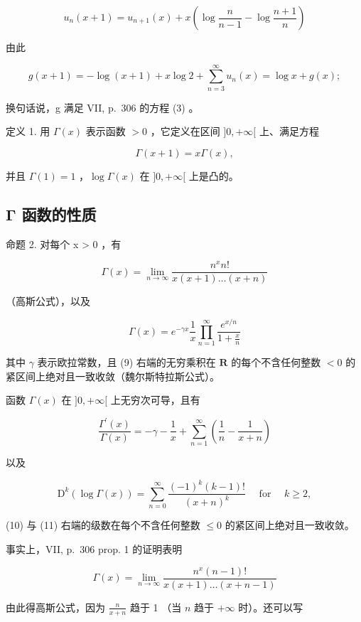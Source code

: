 \[
u _ {n} (x + 1) = u _ {n + 1} (x) + x \left(\log \frac {n}{n - 1} - \log \frac {n + 1}{n}\right)
\]

由此

\[
g (x + 1) = - \log (x + 1) + x \log 2 + \sum_ {n = 3} ^ {\infty} u _ {n} (x) = \log x + g (x);
\]

换句话说，g 满足 VII, p.~306 的方程 (3) 。

定义 1. 用 \(\Gamma(x)\) 表示函数 \(>0\) ，它定义在区间 \(]0, +\infty[\) 上、满足方程

\[
\Gamma (x + 1) = x \Gamma (x),\tag{7}
\]

并且 \(\Gamma(1) = 1\) ，\(\log \Gamma(x)\) 在 \(]0, +\infty[\) 上是凸的。

\subsection{Γ 函数的性质}

命题 2. 对每个 x \textgreater{} 0 ，有

\[
\Gamma (x) = \lim _ {n \rightarrow \infty} \frac {n ^ {x} n !}{x (x + 1) \dots (x + n)}\tag{8}
\]

（高斯公式），以及

\[
\Gamma (x) = e ^ {- \gamma x} \frac {1}{x} \prod_ {n = 1} ^ {\infty} \frac {e ^ {x / n}}{1 + \frac {x}{n}}\tag{9}
\]

其中 \(\gamma\) 表示欧拉常数，且 (9) 右端的无穷乘积在 \(\mathbf{R}\) 的每个不含任何整数 \(< 0\) 的紧区间上绝对且一致收敛（魏尔斯特拉斯公式）。

函数 \(\Gamma(x)\) 在 \(]0, +\infty[\) 上无穷次可导，且有

\[
{\frac {\Gamma^ {\prime} (x)}{\Gamma (x)}} = - \gamma - {\frac {1}{x}} + \sum_ {n = 1} ^ {\infty} \left({\frac {1}{n}} - {\frac {1}{x + n}}\right)\tag{10}
\]

以及

\[
\mathrm{D} ^ {k} (\log \Gamma (x)) = \sum_ {n = 0} ^ {\infty} \frac {(- 1) ^ {k} (k - 1) !}{(x + n) ^ {k}} \quad \text { for } \quad k \geqslant 2,\tag{11}
\]

(10) 与 (11) 右端的级数在每个不含任何整数 \(\leqslant 0\) 的紧区间上绝对且一致收敛。

事实上，VII, p.~306 prop. 1 的证明表明

\[
\Gamma (x) = \lim _ {n \rightarrow \infty} \frac {n ^ {x} (n - 1) !}{x (x + 1) \dots (x + n - 1)}
\]

由此得高斯公式，因为 \(\frac{n}{x + n}\) 趋于 1 （当 \(n\) 趋于 \(+\infty\) 时）。还可以写

